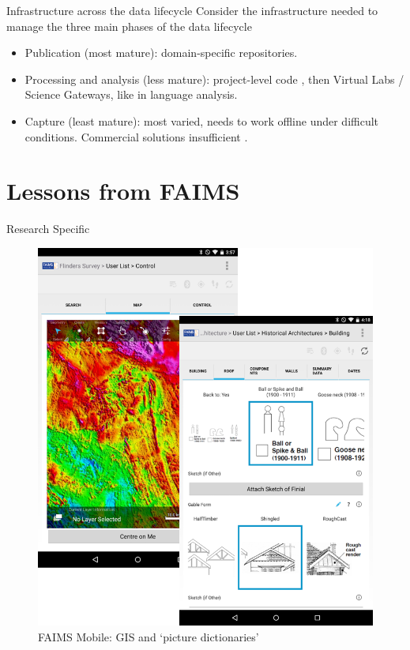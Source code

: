 \documentclass[aspectratio=169, 12pt]{beamer} %
\begin{document}
\begin{frame}{Infrastructure across the data lifecycle}
    Consider the infrastructure needed to manage the three main phases of the data lifecycle
    \begin{itemize}[label=\textbullet]
        \item Publication (most mature): domain-specific repositories.
        \item Processing and analysis (less mature): project-level code \cite{Stewart_Lowndes2017-lj}, then Virtual Labs / Science Gateways, like \cite{Alveo2019-tk} in language analysis.
        \item Capture (least mature): most varied, needs to work offline under difficult conditions. Commercial solutions insufficient \cite{Bureau_of_Reclamation2017-xl}.
    \end{itemize}
\end{frame}



\section{Lessons from FAIMS}

\begin{frame}{Research Specific}
 \begin{figure}[H]
    \centering
        \includegraphics[height=.75\textheight]{figures/FAIMS-screenshots.png}
        \caption{FAIMS Mobile: GIS and `picture dictionaries'}
        \label{fig:FAIMS-mobile-screenshots}
 \end{figure}
\end{frame}
\end{document}
